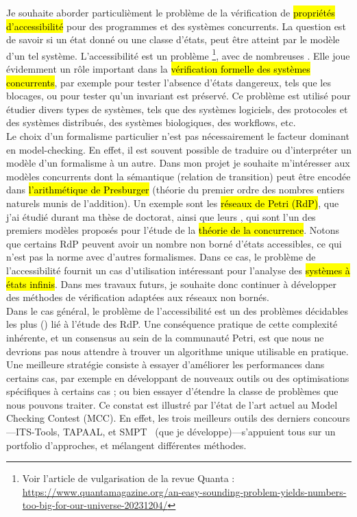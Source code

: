 Je souhaite aborder particulièment le problème de la vérification de
\hl{propriétés d'accessibilité} pour des programmes et des systèmes concurrents.
La question est de savoir si un état donné ou une classe d'états, peut être
atteint par le modèle d'un tel système. L'accessibilité est un problème
\footnote{Voir l'article de vulgarisation de la
revue Quanta :\\
\url{https://www.quantamagazine.org/an-easy-sounding-problem-yields-numbers-too-big-for-our-universe-20231204/}},
avec de nombreuses . Elle joue évidemment un rôle
important dans la \hl{vérification formelle des systèmes concurrents}, par exemple
pour tester l'absence \og d'états dangereux\fg, tels que les blocages, ou pour
tester qu'un invariant est préservé. Ce problème est utilisé pour étudier divers
types de systèmes, tels que des systèmes
logiciels,
des protocoles et des systèmes distribués, des systèmes
biologiques, des
workflows, etc.\\

Le choix d'un formalisme particulier n'est pas nécessairement le facteur
dominant en model-checking. En effet, il est souvent possible de traduire ou
d'interpréter un modèle d'un formalisme à un autre. Dans mon projet je souhaite
m'intéresser aux modèles concurrents dont la sémantique (relation de transition)
peut être encodée dans \hl{l'arithmétique de Presburger} (théorie du premier
ordre des nombres entiers naturels munis de l'addition). Un exemple sont les
\hl{réseaux de Petri (RdP)}, que j'ai étudié durant ma thèse de doctorat, ainsi
que leurs , qui sont l'un des premiers modèles proposés pour
l'étude de la \hl{théorie de la concurrence}. Notons que certains RdP peuvent
avoir un nombre non borné d'états accessibles, ce qui n'est pas la norme avec
d'autres formalismes. Dans ce cas, le problème de l'accessibilité fournit un cas
d'utilisation intéressant pour l'analyse des \hl{systèmes à états infinis}. Dans
mes travaux futurs, je souhaite donc continuer à développer des méthodes de
vérification adaptées aux réseaux non bornés.\\

Dans le cas général, le problème de l'accessibilité est un des problèmes
décidables les plus  () lié à l'étude des
RdP. Une conséquence pratique de cette \og complexité inhérente\fg, et un
consensus au sein de la communauté Petri, est que nous ne devrions pas nous
attendre à trouver un algorithme unique utilisable en pratique.
Une meilleure stratégie consiste à essayer d'améliorer les performances dans
certains cas, par exemple en développant de nouveaux outils ou des optimisations
spécifiques à certains cas ; ou bien essayer d'étendre la classe de problèmes
que nous pouvons traiter. 
Ce constat est illustré par l'état de l'art actuel au Model Checking Contest
(MCC). En effet, les trois meilleurs outils des derniers
concours---\textsf{ITS-Tools},
\textsf{TAPAAL}, et \textsf{SMPT}~\cite{amat_smpt_2023}
(que je développe)---s'appuient tous sur un portfolio d'approches, et mélangent
différentes méthodes.\\

